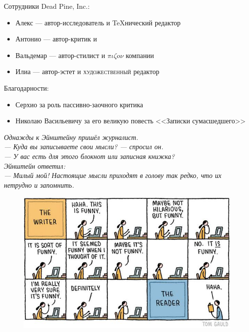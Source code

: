 \documentclass{ideas}
\renewcommand{\author}{Dead Pine, Inc.}
\begin{document}
\vfill
\begin{center}
Сотрудники \author:
  \begin{itemize}
    \item Алекс ---  автор-исследователь и {\TeX}нический редактор
    \item Антонио --- автор-критик и 
    \item Вальдемар --- автор-стилист и \( \pi\iota\zeta o \nu \) компании
    \item Илиа --- автор-эстет и {\selectfont\scshape художественный} редактор
  \end{itemize}

\vfill
Благодарности:
  \begin{itemize}
    \item Серхио за роль пассивно-заочного критика
    \item Николаю Васильевичу за его великую повесть <<Записки сумасшедшего>>
  \end{itemize}
\end{center}
\vfill
\newpage
\emph{Однажды к Эйнштейну пришёл журналист.\\
--- Куда вы записываете свои мысли? --- спросил он.\\
--- У вас есть для этого блокнот или записная книжка?\\
Эйнштейн ответил:\\
--- Милый мой! Настоящие мысли приходят в голову так редко, что их нетрудно и запомнить.}
\begin{figure}[ht!]
    \centering
    \includegraphics[width=\textwidth]{ideas}
\end{figure}
\newpage
\end{document}
